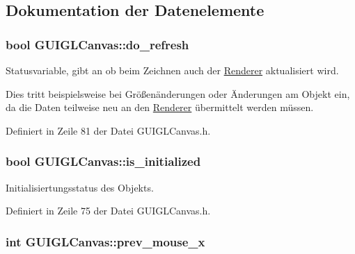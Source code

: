 \subsection{Dokumentation der Datenelemente}
\hypertarget{classGUIGLCanvas_a7139f37aa028f71e393a0c479299455d}{
\subsubsection[{do\-\_\-refresh}]{\setlength{\rightskip}{0pt plus 5cm}bool G\-U\-I\-G\-L\-Canvas\-::do\-\_\-refresh\hspace{0.3cm}{\ttfamily [private]}}}\label{classGUIGLCanvas_a7139f37aa028f71e393a0c479299455d}


Statusvariable, gibt an ob beim Zeichnen auch der \hyperlink{classRenderer}{Renderer} aktualisiert wird. 

Dies tritt beispielsweise bei Größenänderungen oder Änderungen am Objekt ein, da die Daten teilweise neu an den \hyperlink{classRenderer}{Renderer} übermittelt werden müssen. 

Definiert in Zeile 81 der Datei G\-U\-I\-G\-L\-Canvas.\-h.

\hypertarget{classGUIGLCanvas_a59e01564652765dec69e7097c10b4455}{
\subsubsection[{is\-\_\-initialized}]{\setlength{\rightskip}{0pt plus 5cm}bool G\-U\-I\-G\-L\-Canvas\-::is\-\_\-initialized\hspace{0.3cm}{\ttfamily [private]}}}\label{classGUIGLCanvas_a59e01564652765dec69e7097c10b4455}


Initialisiertungsstatus des Objekts. 



Definiert in Zeile 75 der Datei G\-U\-I\-G\-L\-Canvas.\-h.

\hypertarget{classGUIGLCanvas_afc22c47a62b8d5b165a22d059816ee22}{
\subsubsection[{prev\-\_\-mouse\-\_\-x}]{\setlength{\rightskip}{0pt plus 5cm}int G\-U\-I\-G\-L\-Canvas\-::prev\-\_\-mouse\-\_\-x\hspace{0.3cm}{\ttfamily [private]}}}\label{classGUIGLCanvas_afc22c47a62b8d5b165a22d059816ee22}


